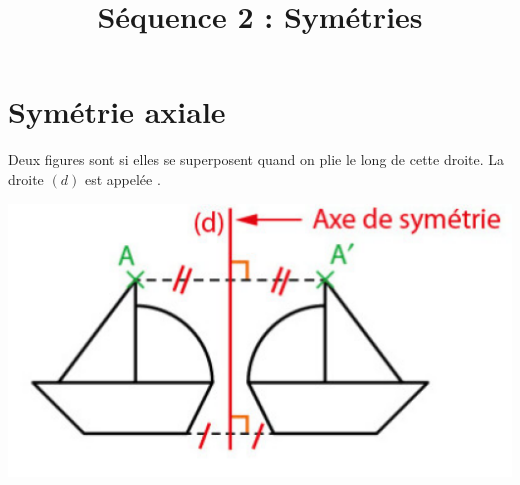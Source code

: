 \documentclass[xcolor={dvipsnames}]{beamer}
\title{Séquence 2 : Symétries}
\begin{document}
\begin{frame}
  \titlepage 
\end{frame}


	



\section{Symétrie axiale}




\begin{frame}{}
	\begin{mydef}
		Deux figures sont  si elles se superposent quand on plie le long de cette droite. 
		La droite $(d)$ est appelée .	
	
	\end{mydef}

	\begin{myex}
		\begin{center}
			\includegraphics[scale=.5]{fig1}
		\end{center}	
	\end{myex}


\end{frame}
\end{document}
